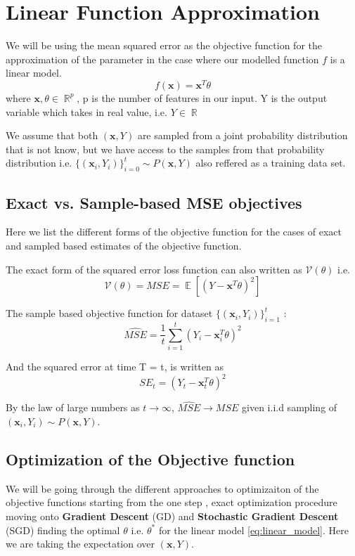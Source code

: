 \documentclass[twoside]{article}
\DeclareMathOperator{\E}{\mathbb{E}}
\DeclareMathOperator{\real}{\mathbb{R}}
\begin{document}
\section{Linear Function Approximation}
We will be using the mean squared error as the objective function for the approximation of the parameter in the case where our modelled function $f$ is a linear model.
\begin{equation}\label{eq:linear_model}
    f(\textbf{x}) = \textbf{x}^T\theta
\end{equation} 
where $\textbf{x},\theta \in \real^p$, p is the number of features in our input. Y is the output variable which takes in real value, i.e. $Y \in \real$

We assume that both $(\textbf{x},Y)$ are sampled from a joint probability distribution that is not know, but we have access to the samples from that probability distribution i.e. $\{(\textbf{x}_i,Y_i)\}_{i =0}^{t} \sim P(\textbf{x},Y)$ also reffered as a training data set. 

\subsection{Exact vs. Sample-based MSE objectives}
Here we list the different forms of the objective function for the cases of exact and sampled based estimates of the objective function.


The exact form of the squared error loss function can also written as $\mathcal{V}(\theta)$ i.e.
\begin{equation}\label{eq:MSE_exact}
    \mathcal{V}(\theta) = MSE = \E[(Y - \textbf{x}^T\theta)^2]
\end{equation}

The sample based objective function for dataset $\{ (\textbf{x}_i, Y_i)\}_{i = 1}^{t}$ : 
\begin{equation}\label{eq:MSE_sample}
    \hat{MSE} = \dfrac{1}{t}\sum_{i = 1}^{t}(Y_i - \textbf{x}_i^T\theta)^2
\end{equation}

And the squared error at time T = t, is written as 
\begin{equation}
    SE_t  = (Y_t - \textbf{x}_t^T\theta)^2
\end{equation}

By the law of large numbers as $t \rightarrow \infty$, $\hat{MSE} \rightarrow MSE$ given i.i.d sampling of $(\textbf{x}_i, Y_i) \sim P(\textbf{x}, Y)$.

\subsection{Optimization of the Objective function}
We will be going through the different approaches to optimizaiton of the objective functions starting from the one step , exact optimization procedure moving onto\textbf{ Gradient Descent} (GD) and \textbf{Stochastic Gradient Descent} (SGD) finding the optimal $\theta$ i.e. $\theta^*$ for the linear model \ref{eq:linear_model}.
Here we are taking the expectation over $(\textbf{x}, Y)$.
\end{document}
